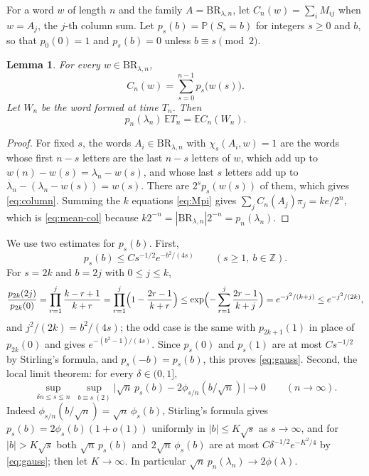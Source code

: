 \documentclass[11pt]{amsart}
\newtheorem{lemma}[theorem]{Lemma}
\theoremstyle{remark}
\numberwithin{equation}{section}
\newcommand{\PP}{\mathbb{P}}
\newcommand{\EE}{\mathbb{E}}
\newcommand{\Z}{\mathbb{Z}}
\newcommand{\BR}{\mathrm{BR}}
\begin{document}
For a word $w$ of length $n$ and the family $A=\BR_{\lambda,n}$, let $C_n(w)=\sum_{i}M_{ij}$ when $w=A_j$, the $j$-th column sum. Let $p_s(b)=\PP(S_s=b)$ for integers $s\ge0$ and $b$, so that $p_0(0)=1$ and $p_s(b)=0$ unless $b\equiv s\pmod 2$.

\begin{lemma}\label{lem:column}
For every $w\in\BR_{\lambda,n}$,
\begin{equation}\label{eq:column}
C_n(w)=\sum_{s=0}^{n-1}p_s\bigl(w(s)\bigr).
\end{equation}
Let $W_n$ be the word formed at time $T_n$. Then
\begin{equation}\label{eq:mean-col}
p_n(\lambda_n)\,\EE T_n=\EE C_n(W_n).
\end{equation}
\end{lemma}

\begin{proof}
For fixed $s$, the words $A_i\in\BR_{\lambda,n}$ with $\chi_s(A_i,w)=1$ are the words whose first $n-s$ letters are the last $n-s$ letters of $w$, which add up to $w(n)-w(s)=\lambda_n-w(s)$, and whose last $s$ letters add up to $\lambda_n-(\lambda_n-w(s))=w(s)$. There are $2^sp_s(w(s))$ of them, which gives \eqref{eq:column}. Summing the $k$ equations \eqref{eq:Mpi} gives $\sum_jC_n(A_j)\pi_j=ke/2^n$, which is \eqref{eq:mean-col} because $k2^{-n}=|\BR_{\lambda,n}|2^{-n}=p_n(\lambda_n)$.
\end{proof}

We use two estimates for $p_s(b)$. First,
\begin{equation}\label{eq:gauss}
p_s(b)\le Cs^{-1/2}e^{-b^2/(4s)}\qquad(s\ge1,\ b\in\Z).
\end{equation}
For $s=2k$ and $b=2j$ with $0\le j\le k$,
\[
\frac{p_{2k}(2j)}{p_{2k}(0)}=\prod_{r=1}^{j}\frac{k-r+1}{k+r}=\prod_{r=1}^{j}\Bigl(1-\frac{2r-1}{k+r}\Bigr)\le\exp\Bigl(-\sum_{r=1}^j\frac{2r-1}{k+j}\Bigr)=e^{-j^2/(k+j)}\le e^{-j^2/(2k)},
\]
and $j^2/(2k)=b^2/(4s)$; the odd case is the same with $p_{2k+1}(1)$ in place of $p_{2k}(0)$ and gives $e^{-(b^2-1)/(4s)}$. Since $p_s(0)$ and $p_s(1)$ are at most $Cs^{-1/2}$ by Stirling's formula, and $p_s(-b)=p_s(b)$, this proves \eqref{eq:gauss}. Second, the local limit theorem: for every $\delta\in(0,1]$,
\begin{equation}\label{eq:llt}
\sup_{\delta n\le s\le n}\ \sup_{b\equiv s\ (2)}\bigl|\sqrt n\,p_s(b)-2\phi_{s/n}(b/\sqrt n)\bigr|\to0\qquad(n\to\infty).
\end{equation}
Indeed $\phi_{s/n}(b/\sqrt n)=\sqrt n\,\phi_s(b)$, Stirling's formula gives $p_s(b)=2\phi_s(b)(1+o(1))$ uniformly in $|b|\le K\sqrt s$ as $s\to\infty$, and for $|b|>K\sqrt s$ both $\sqrt n\,p_s(b)$ and $2\sqrt n\,\phi_s(b)$ are at most $C\delta^{-1/2}e^{-K^2/4}$ by \eqref{eq:gauss}; then let $K\to\infty$. In particular $\sqrt n\,p_n(\lambda_n)\to2\phi(\lambda)$.
\end{document}
